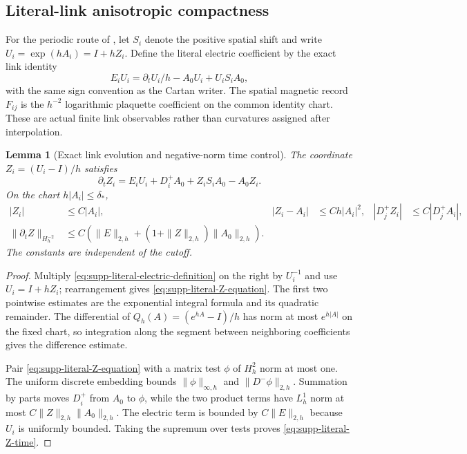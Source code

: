 \documentclass[11pt]{article}
\numberwithin{equation}{section}
\newtheorem{lemma}[lemma]{Lemma}
\theoremstyle{definition}
\theoremstyle{remark}
\begin{document}
\subsection{Literal-link anisotropic compactness}
\label{subsubsec:supp-literal-link-compactness}

For the periodic route of , let
$S_i$ denote the positive spatial shift and write
$U_i=\exp(hA_i)=I+hZ_i$.  Define the literal electric coefficient by the
exact link identity
\begin{equation}
 E_iU_i=\partial_tU_i/h-A_0U_i+U_iS_iA_0,
 \label{eq:supp-literal-electric-definition}
\end{equation}
with the same sign convention as the Cartan writer.  The spatial magnetic
record $F_{ij}$ is the $h^{-2}$ logarithmic plaquette coefficient on the
common identity chart.  These are actual finite link observables rather than
curvatures assigned after interpolation.

\begin{lemma}[Exact link evolution and negative-norm time control]
\label{lem:supp-literal-link-evolution}
The coordinate $Z_i=(U_i-I)/h$ satisfies
\begin{equation}
 \partial_tZ_i
 =E_iU_i+D_i^+A_0+Z_iS_iA_0-A_0Z_i.
 \label{eq:supp-literal-Z-equation}
\end{equation}
On the chart $h|A_i|\le\delta_*$,
\begin{align}
 |Z_i|&\le C|A_i|,
 &|Z_i-A_i|&\le Ch|A_i|^2,
 &|D_j^+Z_i|&\le C|D_j^+A_i|,
 \label{eq:supp-literal-Z-comparison}\\
 \|\partial_tZ\|_{H_h^{-2}}
 &\le C\left(\|E\|_{2,h}
 +(1+\|Z\|_{2,h})\|A_0\|_{2,h}\right).
 \label{eq:supp-literal-Z-time}
\end{align}
The constants are independent of the cutoff.
\end{lemma}
\begin{proof}
Multiply \eqref{eq:supp-literal-electric-definition} on the right by
$U_i^{-1}$ and use $U_i=I+hZ_i$; rearrangement gives
\eqref{eq:supp-literal-Z-equation}.  The first two pointwise estimates are
the exponential integral formula and its quadratic remainder.  The
differential of $Q_h(A)=(e^{hA}-I)/h$ has norm at most $e^{h|A|}$ on the
fixed chart, so integration along the segment between neighboring
coefficients gives the difference estimate.

Pair \eqref{eq:supp-literal-Z-equation} with a matrix test $\phi$ of
$H_h^2$ norm at most one.  The uniform discrete embedding bounds
$\|\phi\|_{\infty,h}$ and $\|D^-\phi\|_{2,h}$.  Summation by parts moves
$D_i^+$ from $A_0$ to $\phi$, while the two product terms have $L_h^1$ norm
at most $C\|Z\|_{2,h}\|A_0\|_{2,h}$.  The electric term is bounded by
$C\|E\|_{2,h}$ because $U_i$ is uniformly bounded.  Taking the supremum over
tests proves \eqref{eq:supp-literal-Z-time}.
\end{proof}
\end{document}

